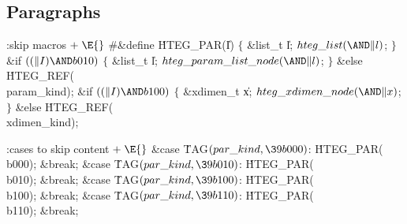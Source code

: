 

\subsection{Paragraphs}
\noindent
\Y\B\4:skip macros\X${}\mathrel+\E{}$\6
\8\#\&{define} \.{HTEG\_PAR}(\|I)\1\6
\4${}\{{}$\5
\&{list\_t} \|l;\5
${}\index{hteg list+\\{hteg\_list}}\\{hteg\_list}({\AND}\|l){}$;\5
${}\}{}$\2\7
\&{if} ${}((\|I)\AND\\{b010}){}$\5
\1${}\{{}$\5
\&{list\_t} \|l;\5
${}\index{hteg param list node+\\{hteg\_param\_list\_node}}\\{hteg\_param\_list\_node}({\AND}\|l){}$;\5
${}\}{}$\2\6
\&{else}\1\5
\.{HTEG\_REF}(\\{param\_kind});\2\6
\&{if} ${}((\|I)\AND\\{b100}){}$\5
\1${}\{{}$\5
\&{xdimen\_t} \|x;\5
${}\index{hteg xdimen node+\\{hteg\_xdimen\_node}}\\{hteg\_xdimen\_node}({\AND}\|x){}$;\5
${}\}{}$\2\6
\&{else}\1\5
\.{HTEG\_REF}(\\{xdimen\_kind});\2
\Y
\fi


\Y\B\4:cases to skip content\X${}\mathrel+\E{}$\6
\4\&{case} \.{TAG}${}(\index{par kind+\\{par\_kind}}\\{par\_kind},\39\\{b000}){}$:\5
\.{HTEG\_PAR}(\\{b000});\5
\&{break};\6
\4\&{case} \.{TAG}${}(\index{par kind+\\{par\_kind}}\\{par\_kind},\39\\{b010}){}$:\5
\.{HTEG\_PAR}(\\{b010});\5
\&{break};\6
\4\&{case} \.{TAG}${}(\index{par kind+\\{par\_kind}}\\{par\_kind},\39\\{b100}){}$:\5
\.{HTEG\_PAR}(\\{b100});\5
\&{break};\6
\4\&{case} \.{TAG}${}(\index{par kind+\\{par\_kind}}\\{par\_kind},\39\\{b110}){}$:\5
\.{HTEG\_PAR}(\\{b110});\5
\&{break};
\Y
\fi

